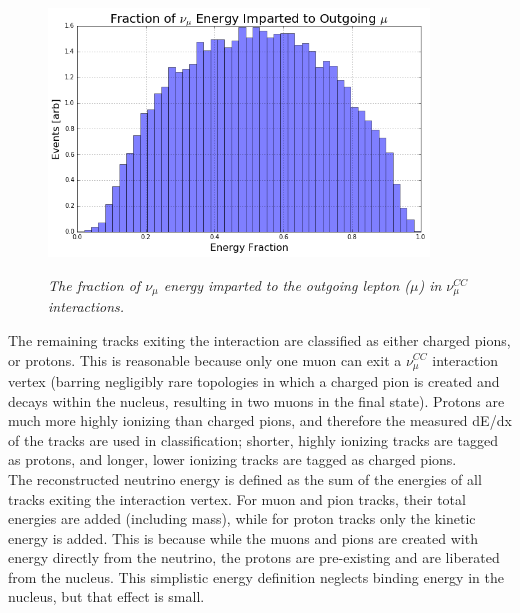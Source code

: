 \begin{figure}[ht!]
\centering
	\includegraphics[width=0.9\textwidth]{Figures/numuCC_energyfraction_tomuon.png} \\
\caption{\textit{The fraction of $\nu_\mu$ energy imparted to the outgoing lepton ($\mu$) in $\nu_\mu^{CC}$ interactions.}}\label{numuCC_energyfraction_tomuon_fig}
\end{figure}

The remaining tracks exiting the interaction are classified as either charged pions, or protons. This is reasonable because only one muon can exit a $\nu_\mu^{CC}$ interaction vertex (barring negligibly rare topologies in which a charged pion is created and decays within the nucleus, resulting in two muons in the final state). Protons are much more highly ionizing than charged pions, and therefore the measured dE/dx of the tracks are used in classification; shorter, highly ionizing tracks are tagged as protons, and longer, lower ionizing tracks are tagged as charged pions.\\

The reconstructed neutrino energy is defined as the sum of the energies of all tracks exiting the interaction vertex. For muon and pion tracks, their total energies are added (including mass), while for proton tracks only the kinetic energy is added. This is because while the muons and pions are created with energy directly from the neutrino, the protons are pre-existing and are liberated from the nucleus. This simplistic energy definition neglects binding energy in the nucleus, but that effect is small.\\

